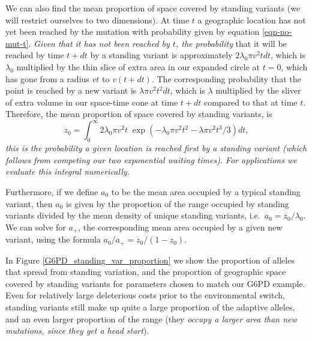\documentclass{article}
\newcommand{\gc}[1]{{\it\color{blue}#1}}
\newcommand{\mfp}[1]{{\it\color{red}#1}}
\newcommand{\plr}[1]{{\it\color{Fuchsia}#1}}
\begin{document}
We can also find the mean proportion of space covered by standing
variants (we will restrict ourselves to two dimensions).
At time $t$ a geographic location has not yet been reached by the
mutation with probability given by equation \eqref{eqn-no-mut-t}.
\mfp{Given that it has not been reached by $t$, the probability} that it will be reached by time $t+dt$ 
by a standing variant is approximately $2 \lambda_0 \pi v^2 t dt$,
which is $\lambda_0$ multiplied by the thin slice of extra area in our
expanded circle at $t=0$, which has gone from a radius $vt$ to
$v(t+dt)$. The corresponding probability that the point is reached by a new
variant is 
$\lambda \pi v^2 t^2 dt$, which is $\lambda$ multiplied by the
sliver of  extra volume in our space-time cone at time $t+dt$ compared to that at time $t$.
Therefore, the mean proportion of space covered by standing variants,
is
\begin{equation} \label{prop_space_standing}
    z_0 = \int_0^\infty {2 \lambda_0 \pi v^2 t} \; \exp \left( -
      \lambda_0 \pi v^2 t^2 - \lambda \pi v^2 t^3 / 3 \right) dt,
\end{equation}
\mfp{this is the probability a given location is reached first by a
standing variant (which follows from competing our two exponential
waiting times).}
\gc{For applications we evaluate this integral numerically.}

Furthermore, if we define $a_0$ to be the mean area occupied by a typical standing variant, 
then $a_0$ is given by the proportion of the range occupied by standing variants divided by the mean density of unique standing variants,
i.e.\ $a_0 = z_0 / \lambda_0$.
We can solve for $a_+$, the corresponding mean area occupied by a given new variant, 
using the formula $a_0 / a_+ = z_0 / (1-z_0)$.

In Figure \ref{G6PD_standing_var_proportion} we show the proportion of
alleles that spread from standing variation, and the proportion of
geographic space covered by standing variants for parameters chosen to match our G6PD example.
Even for relatively large deleterious costs prior to the environmental switch, 
standing variants still make up quite a large proportion of the adaptive alleles, 
and an even larger proportion of the range 
(they \mfp{occupy a larger area than new mutations, since they get a head start}).
\end{document}
